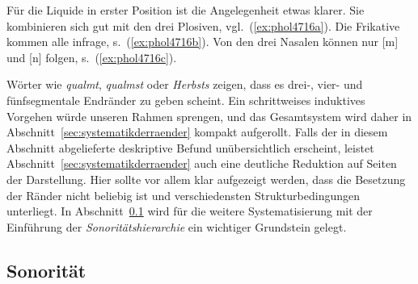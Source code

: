 Für die Liquide in erster Position ist die Angelegenheit etwas klarer.
Sie kombinieren sich gut mit den drei Plosiven, vgl.\ (\ref{ex:phol4716a}).
Die Frikative kommen alle infrage, s.\ (\ref{ex:phol4716b}).
Von den drei Nasalen können nur [m] und [n] folgen, s.\ (\ref{ex:phol4716c}).

\begin{exe}
  \ex\label{ex:phol4716}
  \begin{xlist}
  \end{xlist}
\end{exe}

Wörter wie \textit{qualmt}, \textit{qualmst} oder \textit{Herbsts} zeigen, dass es drei-, vier- und fünfsegmentale Endränder zu geben scheint.
Ein schrittweises induktives Vorgehen würde unseren Rahmen sprengen, und das Gesamtsystem wird daher in Abschnitt~\ref{sec:systematikderraender} kompakt aufgerollt.
Falls der in diesem Abschnitt abgelieferte deskriptive Befund unübersichtlich erscheint, leistet Abschnitt~\ref{sec:systematikderraender} auch eine deutliche Reduktion auf Seiten der Darstellung.
Hier sollte vor allem klar aufgezeigt werden, dass die Besetzung der Ränder nicht beliebig ist und verschiedensten Strukturbedingungen unterliegt.
In Abschnitt~\ref{sec:sonoritaet} wird für die weitere Systematisierung mit der Einführung der \textit{Sonoritätshierarchie} ein wichtiger Grundstein gelegt.


\subsection{Sonorität}

\label{sec:sonoritaet}

